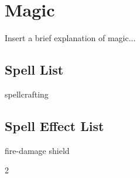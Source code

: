 \chapter{Magic}\label{magic}

\begin{multicols*}{2}
    Insert a brief explanation of magic...
    
    \section{Spell List}
    
    {spellcrafting}
	
    \section{Spell Effect List}
    {fire-damage}
    {shield}

\end{multicols*}{2}
